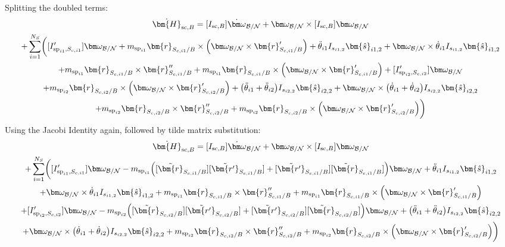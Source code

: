 Splitting the doubled terms:
\begin{multline}
	\dot{\bm{H}}_{\text{sc},B} = [I_{\text{sc},B}]\dot{\bm\omega}_{\cal B/N}	+ \bm\omega_{\cal B/N} \times [I_{\text{sc},B}] \bm\omega_{\cal B/N} \\
	+\sum\limits_{i=1}^{N_S} \biggl( [I'_{\text{sp}_{i1},S_{c,i1}}] \bm\omega_{\cal B/N} + m_{\text{sp}_{i1}} \bm{r}_{S_{c,i1}/B} \times \Big( \bm\omega_{\cal B/N} \times \bm{r}'_{S_{c,i1}/B}\Big)
	+ \ddot{\theta}_{i1} I_{s_{i1,2}}\bm{\hat{s}}_{i1,2}+ \bm\omega_{\cal B/N} \times \dot{\theta}_{i1} I_{s_{i1,2}}\bm{\hat{s}}_{i1,2}	\\
	+m_{\text{sp}_{i1}} \bm{r}_{S_{c,i1}/B} \times \bm{r}''_{S_{c,i1}/B}
	+ m_{\text{sp}_{i1}} \bm{r}_{S_{c,i1}/B} \times \Big( \bm\omega_{\cal B/N} \times \bm{r}'_{S_{c,i1}/B}\Big)	+ [I'_{\text{sp}_{i2},S_{c,i2}}] \bm\omega_{\cal B/N} \\
	+ m_{\text{sp}_{i2}} \bm{r}_{S_{c,i2}/B} \times \Big(\bm\omega_{\cal B/N} \times \bm{r}'_{S_{c,i2}/B}\Big)
	+ \big(\ddot{\theta}_{i1} + \ddot{\theta}_{i2}\big) I_{s_{i2,2}}\bm{\hat{s}}_{i2,2} +
	\bm\omega_{\cal B/N} \times \big(\dot{\theta}_{i1} + \dot{\theta}_{i2}\big) I_{s_{i2,2}}\bm{\hat{s}}_{i2,2}\\
	+m_{\text{sp}_{i2}} \bm{r}_{S_{c,i2}/B} \times \bm{r}''_{S_{c,i2}/B} + m_{\text{sp}_{i2}} \bm{r}_{S_{c,i2}/B} \times \Big(\bm\omega_{\cal B/N} \times \bm{r}'_{S_{c,i2}/B}\Big)\biggr)
	\label{eq:Hbdot19}
\end{multline}
Using the Jacobi Identity again, followed by tilde matrix substitution:
\begin{multline}
	\dot{\bm{H}}_{\text{sc},B} = [I_{\text{sc},B}]\dot{\bm\omega}_{\cal B/N}	+ \bm\omega_{\cal B/N} \times [I_{\text{sc},B}] \bm\omega_{\cal B/N} \\
	+\sum\limits_{i=1}^{N_S} \biggl( [I'_{\text{sp}_{i1},S_{c,i1}}] \bm\omega_{\cal B/N}  - m_{\text{sp}_{i1}}\Big([\tilde{\bm{r}}_{S_{c,i1}/B}][\tilde{\bm{r'}}_{S_{c,i1}/B}] + [\tilde{\bm{r'}}_{S_{c,i1}/B}][\tilde{\bm{r}}_{S_{c,i1}/B}]   \Big)\bm\omega_{\cal B/N}
	+ \ddot{\theta}_{i1} I_{s_{i1,2}}\bm{\hat{s}}_{i1,2}\\
	+ \bm\omega_{\cal B/N} \times \dot{\theta}_{i1} I_{s_{i1,2}}\bm{\hat{s}}_{i1,2}	+m_{\text{sp}_{i1}} \bm{r}_{S_{c,i1}/B} \times \bm{r}''_{S_{c,i1}/B}
	+ m_{\text{sp}_{i1}} \bm{r}_{S_{c,i1}/B} \times \Big( \bm\omega_{\cal B/N} \times \bm{r}'_{S_{c,i1}/B}\Big)	\\
	+ [I'_{\text{sp}_{i2},S_{c,i2}}] \bm\omega_{\cal B/N}  - m_{\text{sp}_{i2}}\Big([\tilde{\bm{r}}_{S_{c,i2}/B}] [\tilde{\bm{r'}}_{S_{c,i2}/B}] + [\tilde{\bm{r'}}_{S_{c,i2}/B}] [\tilde{\bm{r}}_{S_{c,i2}/B}]                 \Big)  \bm\omega_{\cal B/N}
	+ \big(\ddot{\theta}_{i1} + \ddot{\theta}_{i2}\big) I_{s_{i2,2}}\bm{\hat{s}}_{i2,2} \\
	+ \bm\omega_{\cal B/N} \times \big(\dot{\theta}_{i1} + \dot{\theta}_{i2}\big) I_{s_{i2,2}}\bm{\hat{s}}_{i2,2}
	+m_{\text{sp}_{i2}} \bm{r}_{S_{c,i2}/B} \times \bm{r}''_{S_{c,i2}/B} + m_{\text{sp}_{i2}} \bm{r}_{S_{c,i2}/B} \times \Big(\bm\omega_{\cal B/N} \times \bm{r}'_{S_{c,i2}/B}\Big)\biggr)
	\label{eq:Hbdot20}
\end{multline}
